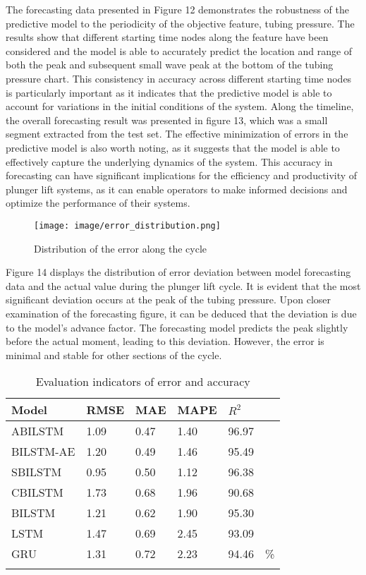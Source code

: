 \documentclass[sn-mathphys,Numbered]{sn-jnl}%
\theoremstyle{thmstyleone}%
\theoremstyle{thmstyletwo}%
\theoremstyle{thmstylethree}%
\begin{document}
The forecasting data presented in Figure 12 demonstrates the robustness of the predictive model to the periodicity of the objective feature, tubing pressure. The results show that different starting time nodes along the feature have been considered and the model is able to accurately predict the location and range of both the peak and subsequent small wave peak at the bottom of the tubing pressure chart. This consistency in accuracy across different starting time nodes is particularly important as it indicates that the predictive model is able to account for variations in the initial conditions of the system. Along the timeline, the overall forecasting result was presented in figure 13, which was a small segment extracted from the test set. The effective minimization of errors in the predictive model is also worth noting, as it suggests that the model is able to effectively capture the underlying dynamics of the system. This accuracy in forecasting can have significant implications for the efficiency and productivity of plunger lift systems, as it can enable operators to make informed decisions and optimize the performance of their systems.

\begin{figure}[htp]
    \centering
    \texttt{[image: image/error\_distribution.png]}
    \caption{\centering  Distribution of the error along the cycle}
    \label{fig:distribution}
\end{figure}

Figure 14 displays the distribution of error deviation between model forecasting data and the actual value during the plunger lift cycle. It is evident that the most significant deviation occurs at the peak of the tubing pressure. Upon closer examination of the forecasting figure, it can be deduced that the deviation is due to the model's advance factor. The forecasting model predicts the peak slightly before the actual moment, leading to this deviation. However, the error is minimal and stable for other sections of the cycle.

\begin{table}[h]
\caption{Evaluation indicators of error and accuracy}\label{tab2}%
\begin{tabular}{l l l l l l}
\toprule
Model & RMSE  & MAE & MAPE & $R^{2}$ & \\
\midrule
ABILSTM    & 1.09   & 0.47  & 1.40 & 96.97 & \\
BILSTM-AE     & 1.20   & 0.49  & 1.46 & 95.49 & \\
SBILSTM    & 0.95   & 0.50  & 1.12 & 96.38 & \\
CBILSTM     & 1.73   & 0.68  & 1.96 & 90.68 &\\
BILSTM     & 1.21   & 0.62  & 1.90 & 95.30 & \\
LSTM       & 1.47   & 0.69  & 2.45 & 93.09 & \\
GRU       & 1.31   & 0.72  & 2.23 & 94.46 & \% \\

\botrule
\end{tabular}
\end{table}
\end{document}
